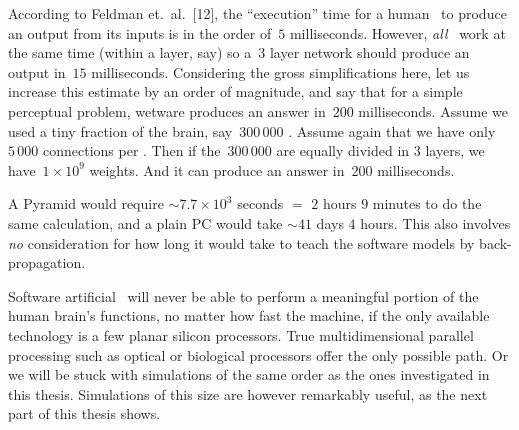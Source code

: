 According to Feldman et.\ al.\ [12], the ``execution'' time for a
human \neu\ to produce an output from its inputs is in the order
of~$5$ milliseconds.
However, {\sl all} \neus\ work at the same time (within a layer,
say) so a~$3$ layer network should produce an output in~$15$
milliseconds.
Considering the gross simplifications here, let us increase this
estimate by an order of magnitude, and say that for a simple
perceptual problem, wetware produces an answer in~$200$
milliseconds.
Assume we used a tiny fraction of the brain, say~$300\,000$ \neus.
Assume again that we have only~$5\,000$ connections per \neu.
Then if the~$300\,000$ are equally divided in 3 layers, we
have~$1\times 10^9$ weights.
And it can produce an answer in~$200$ milliseconds.

A Pyramid would require $\sim 7.7 \times 10^3$ seconds $=$ $2$ hours
$9$ minutes to do the same calculation, and a plain PC would take
$\sim 41$ days $4$ hours.
This also involves {\sl no} consideration for how long it would take
to teach the software models by back-propagation.

Software artificial \nns\ will never be able to perform a 
meaningful portion
of the human brain's functions, no matter how fast the machine, if
the only available technology is a few planar silicon processors.
True multidimensional parallel processing such as optical or
biological processors offer the only possible path.
Or we will be stuck with simulations of the same order as the ones
investigated in this thesis.
Simulations of this size are however remarkably useful, as the next
part of this thesis shows.

